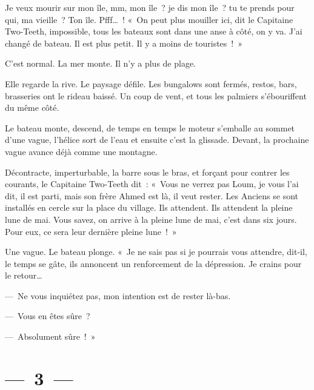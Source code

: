 \documentclass[twoside]{book} %
\begin{document}
\noindent Je veux mourir sur mon île, mm, mon île ? je dis mon île ? tu te prends pour qui, ma vieille ? Ton île. Pfff… ! « On peut plus mouiller ici, dit le Capitaine Two-Teeth, impossible, tous les bateaux sont dans une anse à côté, on y va. J’ai changé de bateau. Il est plus petit. Il y a moins de touristes ! »\par
C’est normal. La mer monte. Il n’y a plus de plage.\par
Elle regarde la rive. Le paysage défile. Les bungalows sont fermés, restos, bars, brasseries ont le rideau baissé. Un coup de vent, et tous les palmiers s’ébouriffent du même côté.\par
Le bateau monte, descend, de temps en temps le moteur s’emballe au sommet d’une vague, l’hélice sort de l’eau et ensuite c’est la glissade. Devant, la prochaine vague avance déjà comme une montagne.\par
Décontracte, imperturbable, la barre sous le bras, et forçant pour contrer les courants, le Capitaine Two-Teeth dit : « Vous ne verrez pas Loum, je vous l’ai dit, il est parti, mais son frère Ahmed est là, il veut rester. Les Anciens se sont installés en cercle sur la place du village. Ils attendent. Ils attendent la pleine lune de mai. Vous savez, on arrive à la pleine lune de mai, c’est dans six jours. Pour eux, ce sera leur dernière pleine lune ! »\par
Une vague. Le bateau plonge. « Je ne sais pas si je pourrais vous attendre, dit-il, le temps se gâte, ils annoncent un renforcement de la dépression. Je crains pour le retour…\par
— Ne vous inquiétez pas, mon intention est de rester là-bas.\par
— Vous en êtes sûre ?\par
— Absolument sûre ! »

\section[{— 3 —}]{— 3 —}
\renewcommand{\leftmark}{— 3 —}
\end{document}
